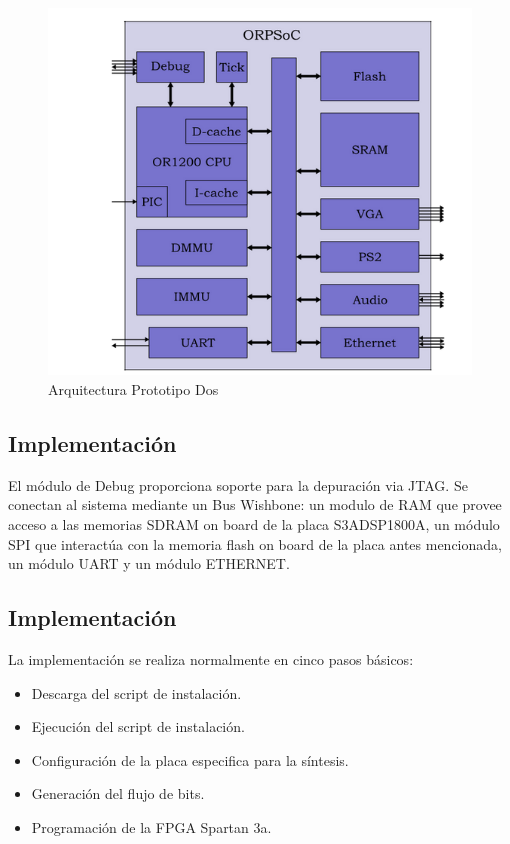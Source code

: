 		\begin{figure}[!h]
 		\begin{center}
  		\includegraphics[width=.7\textwidth,keepaspectratio=true]{./images/orpsoc}
  		\caption{Arquitectura Prototipo Dos}
  		\label{fig:orpsoc} 
 		\end{center}
		\end{figure}



	
		\subsection{Implementación}



		El módulo de Debug proporciona soporte para la depuración via JTAG. Se conectan al sistema mediante un Bus Wishbone: un modulo de RAM que provee
		acceso a las memorias SDRAM on board de la placa S3ADSP1800A, un módulo SPI que interactúa con la memoria flash on board
		de la placa antes mencionada, un módulo UART y un módulo ETHERNET. 

		\subsection{Implementación}
		La implementación se realiza normalmente en cinco pasos básicos: 
		\begin {itemize}
		\item Descarga del script de instalación.
		\item Ejecución del script de instalación.
		\item Configuración de la placa especifica para la síntesis.
		\item Generación del flujo de bits.
		\item Programación de la FPGA Spartan 3a.
 		\end {itemize}
 
